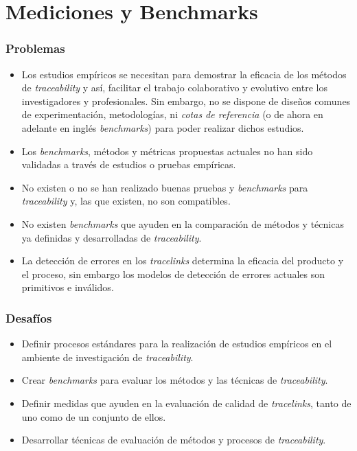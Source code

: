\documentclass[a4paper,12pt,oneside,spanish]{book}
\begin{document}
\section{Mediciones y Benchmarks}

\subsubsection{Problemas}

\begin{itemize}[label={$\times$}]

\item Los estudios empíricos se necesitan para demostrar la eficacia de los métodos de \textit{traceability} y así, facilitar el trabajo colaborativo y evolutivo entre los investigadores y profesionales. Sin embargo, no se dispone de diseños comunes de experimentación, metodologías, ni \textit{cotas de referencia} (o de ahora en adelante en inglés \textit{benchmarks}) para poder realizar dichos estudios.

\item Los \textit{benchmarks}, métodos y métricas propuestas actuales no han sido validadas a través de estudios o pruebas empíricas.

\item No existen o no se han realizado buenas pruebas y \textit{benchmarks} para \textit{traceability} y, las que existen, no son compatibles. 

\item No existen \textit{benchmarks} que ayuden en la comparación de métodos y técnicas ya definidas y desarrolladas de \textit{traceability}.

\item La detección de errores en los \textit{tracelinks} determina la eficacia del producto y el proceso, sin embargo los modelos de detección de errores actuales son primitivos e inválidos.

\end{itemize}

\subsubsection{Desafíos}

\begin{itemize}[label={\checkmark}]

\item Definir procesos estándares para la realización de estudios empíricos en el ambiente de investigación de \textit{traceability}.

\item Crear \textit{benchmarks} para evaluar los métodos y las técnicas de \textit{traceability}.

\item Definir medidas que ayuden en la evaluación de calidad de \textit{tracelinks}, tanto de uno como de un conjunto de ellos.

\item Desarrollar técnicas de evaluación de métodos y procesos de \textit{traceability}.

\end{itemize}
\end{document}
